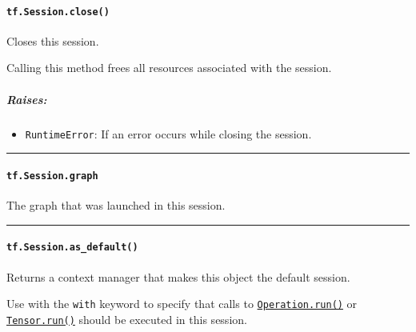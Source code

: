\paragraph{\texorpdfstring{\texttt{tf.Session.close()}
}{tf.Session.close() }}\label{tf.session.close}

Closes this session.

Calling this method frees all resources associated with the session.

\subparagraph{Raises: }\label{raises-1}

\begin{itemize}
\tightlist
\item
  \texttt{RuntimeError}: If an error occurs while closing the session.
\end{itemize}

\begin{center}\rule{0.5\linewidth}{\linethickness}\end{center}

\paragraph{\texorpdfstring{\texttt{tf.Session.graph}
}{tf.Session.graph }}\label{tf.session.graph}

The graph that was launched in this session.

\begin{center}\rule{0.5\linewidth}{\linethickness}\end{center}

\paragraph{\texorpdfstring{\texttt{tf.Session.as\_default()}
}{tf.Session.as\_default() }}\label{tf.session.asux5fdefault}

Returns a context manager that makes this object the default session.

Use with the \texttt{with} keyword to specify that calls to
\href{../../api_docs/python/framework.md\#Operation.run}{\texttt{Operation.run()}}
or
\href{../../api_docs/python/framework.md\#Tensor.run}{\texttt{Tensor.run()}}
should be executed in this session.

\begin{Shaded}
\begin{Highlighting}[]
\OperatorTok{=} 
\OperatorTok{=} 

 
    
   \NormalTok{()}
\end{Highlighting}
\end{Shaded}

